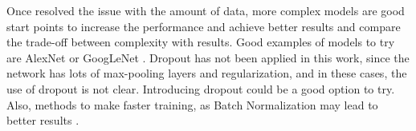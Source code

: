 \documentclass[]{article}
\begin{document}
Once resolved the issue with the amount of data, more complex models are good start points to increase the performance and achieve better results and compare the trade-off between complexity with results. Good examples of models to try are AlexNet \cite{Krizhevsky12} or GoogLeNet \cite{Szegedy16}. Dropout has not been applied in this work, since the network has lots of max-pooling layers and regularization, and in these cases, the use of dropout is not clear. Introducing dropout could be a good option to try. Also, methods to make faster training, as Batch Normalization may lead to better results \cite{szegedy15batch}.

%
\end{document}
